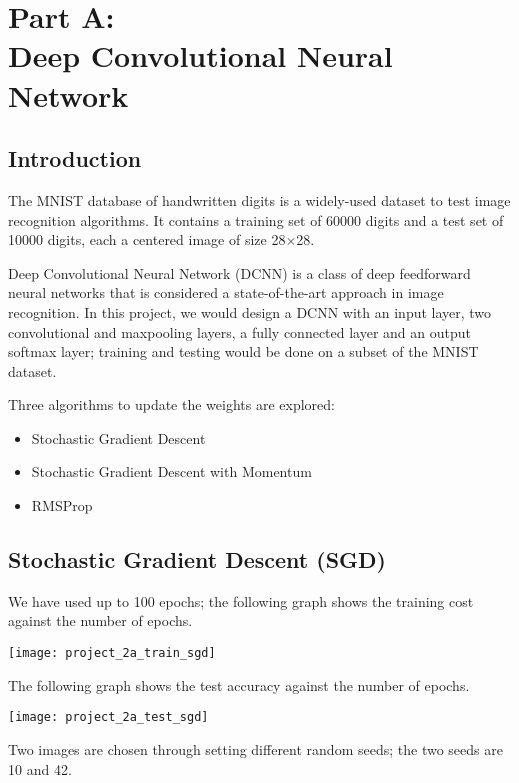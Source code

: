 \chapter*{Part A\@:\\Deep Convolutional Neural Network}

\section*{Introduction}

The MNIST database of handwritten digits is a widely-used dataset to test image
recognition algorithms. It contains a training set of 60000 digits and a test
set of 10000 digits, each a centered image of size 28\(\times \)28.

Deep Convolutional Neural Network (DCNN) is a class of deep feedforward neural
networks that is considered a state-of-the-art approach in image recognition.
In this project, we would design a DCNN with an input layer, two convolutional
and maxpooling layers, a fully connected layer and an output softmax layer;
training and testing would be done on a subset of the MNIST dataset.

Three algorithms to update the weights are explored:
\begin{itemize}
    \item Stochastic Gradient Descent
    \item Stochastic Gradient Descent with Momentum
    \item RMSProp
\end{itemize}

\section*{Stochastic Gradient Descent (SGD)}

We have used up to 100 epochs; the following graph shows the training cost
against the number of epochs.

\begin{center}
    \texttt{[image: project\_2a\_train\_sgd]}
\end{center}

The following graph shows the test accuracy against the number of epochs.

\begin{center}
    \texttt{[image: project\_2a\_test\_sgd]}
\end{center}

Two images are chosen through setting different random seeds; the two seeds
are 10 and 42.

